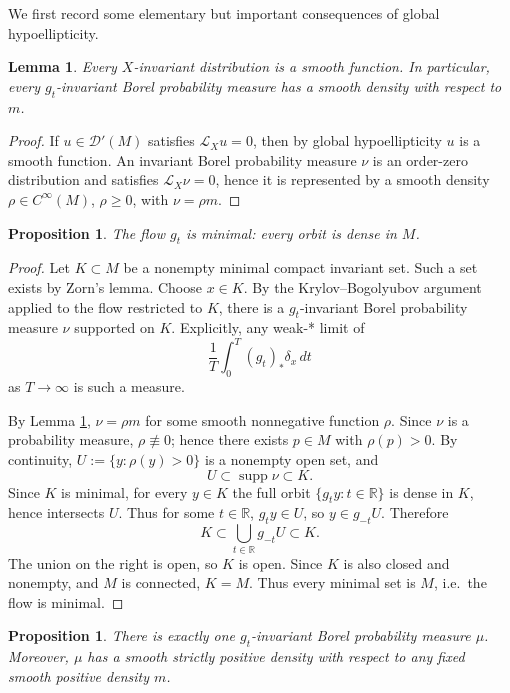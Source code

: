 \documentclass[11pt]{article}
\newtheorem{lemma}[theorem]{Lemma}
\newtheorem{proposition}[theorem]{Proposition}
\theoremstyle{definition}
\begin{document}
We first record some elementary but important consequences of global hypoellipticity.

\begin{lemma}\label{lem:invariant distributions}
Every \(X\)-invariant distribution is a smooth function. In particular, every \(g_t\)-invariant Borel probability measure has a smooth density with respect to \(m\).
\end{lemma}

\begin{proof}
If \(u\in\mathcal D'(M)\) satisfies \(\mathcal L_Xu=0\), then by global hypoellipticity \(u\) is a smooth function. An invariant Borel probability measure \(\nu\) is an order-zero distribution and satisfies \(\mathcal L_X\nu=0\), hence it is represented by a smooth density \(\rho\in C^\infty(M)\), \(\rho\ge 0\), with \(\nu=\rho m\).
\end{proof}

\begin{proposition}\label{prop:minimal}
The flow \(g_t\) is minimal: every orbit is dense in \(M\).
\end{proposition}

\begin{proof}
Let \(K\subset M\) be a nonempty minimal compact invariant set. Such a set exists by Zorn's lemma. Choose \(x\in K\). By the Krylov--Bogolyubov argument applied to the flow restricted to \(K\), there is a \(g_t\)-invariant Borel probability measure \(\nu\) supported on \(K\). Explicitly, any weak-* limit of
\[
\frac1T\int_0^T (g_t)_*\delta_x\,dt
\]
as \(T\to\infty\) is such a measure.

By Lemma \ref{lem:invariant distributions}, \(\nu=\rho m\) for some smooth nonnegative function \(\rho\). Since \(\nu\) is a probability measure, \(\rho\not\equiv 0\); hence there exists \(p\in M\) with \(\rho(p)>0\). By continuity, \(U:=\{y:\rho(y)>0\}\) is a nonempty open set, and
\[
U\subset \operatorname{supp}\nu\subset K.
\]
Since \(K\) is minimal, for every \(y\in K\) the full orbit \(\{g_t y:t\in\mathbb R\}\) is dense in \(K\), hence intersects \(U\). Thus for some \(t\in\mathbb R\), \(g_t y\in U\), so \(y\in g_{-t}U\). Therefore
\[
K\subset \bigcup_{t\in\mathbb R} g_{-t}U\subset K.
\]
The union on the right is open, so \(K\) is open. Since \(K\) is also closed and nonempty, and \(M\) is connected, \(K=M\). Thus every minimal set is \(M\), i.e.\ the flow is minimal.
\end{proof}

\begin{proposition}\label{prop:unique ergodic}
There is exactly one \(g_t\)-invariant Borel probability measure \(\mu\). Moreover, \(\mu\) has a smooth strictly positive density with respect to any fixed smooth positive density \(m\).
\end{proposition}
\end{document}
